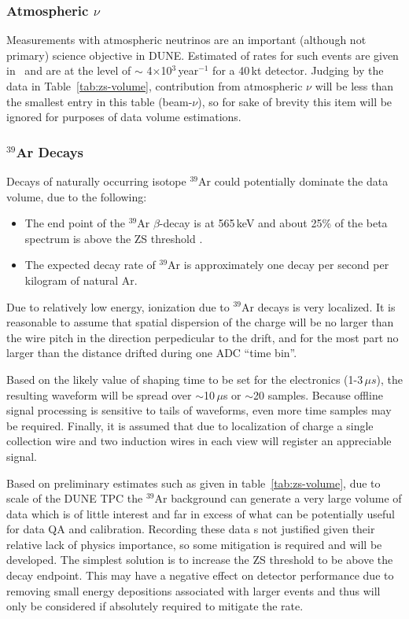 \subsubsection{Atmospheric $\nu$}
\label{sec:atmo-nu}
Measurements with atmospheric neutrinos are an important (although not primary) science objective in DUNE.
Estimated of rates for such events are given in~\cite{sciopps,cdr_vol2} and are at the level of $\sim$
4$\times$10$^3$\,year$^{-1}$ for a 40\,kt detector. Judging by the data in Table~\ref{tab:zs-volume},
contribution from atmospheric $\nu$ will be less than the smallest entry in this table \mbox{(beam-$\nu$)}, so for sake
of brevity this item will be ignored for purposes of data volume estimations.

\subsubsection{$^{39}$Ar Decays}
\label{sec:ar39decays}
Decays of naturally occurring isotope $^{39}$Ar could potentially dominate the data volume,
due to the following:
\begin{itemize}
\item The end point of the $^{39}$Ar $\beta$-decay is at 565\,keV and about
25\% of the beta spectrum is above the ZS threshold \cite{ar39endpoint}.

\item The expected decay rate of $^{39}$Ar is approximately one decay per second per kilogram of natural Ar\cite{ar39bkg}.
\end{itemize}
\noindent
Due to relatively low energy, ionization due to $^{39}$Ar decays is very localized.
It is reasonable to assume that spatial dispersion of the charge will be no larger than the wire pitch
in the direction perpedicular to the drift, and for the most part no larger than the distance drifted
during one ADC ``time bin''.

Based on the likely value of shaping time to be set for the electronics (1-3\,${\mu}s$),
the resulting waveform will be spread over $\sim$10\,$\mu$s or $\sim$20 samples. Because offline signal
processing is sensitive to tails of waveforms, even more time samples may be required.
Finally, it is assumed that due to localization of charge a single collection wire and two induction
wires in each view will register an appreciable signal.

Based on preliminary estimates such as given in table~\ref{tab:zs-volume},
due to scale of the DUNE TPC the $^{39}$Ar background can generate a very large volume
of data which is of little interest and far in excess of what can be potentially useful for data QA and
calibration. Recording these data s not justified given their relative lack
of physics importance, so some mitigation is required and will be developed. The simplest solution
is to increase the ZS threshold to be above the decay endpoint.
This may have a negative effect on detector performance due to removing small energy
depositions associated with larger events and thus will only be
considered if absolutely required to mitigate the rate.

